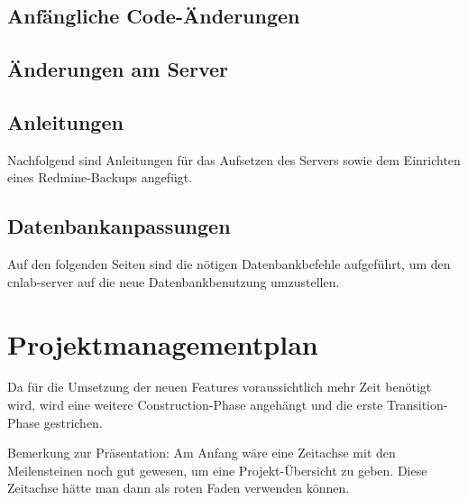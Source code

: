 \documentclass[12pt, a4paper]{report}
\begin{document}
	\section{Anfängliche Code-Änderungen}
	\label{sec:AnfaenglicheCodeAenderungen}
	
	
	\section{Änderungen am Server}
	\label{sec:AenderungenAmServer}
	
	
	\section{Anleitungen}
	\label{sec:Anleitungen}
	Nachfolgend sind Anleitungen für das Aufsetzen des Servers sowie dem Einrichten eines Redmine-Backups angefügt.
	
	
	
	
	\section{Datenbankanpassungen}
	\label{sec:Datenbankanpassungen}
	Auf den folgenden Seiten sind die nötigen Datenbankbefehle aufgeführt, um den cnlab-server auf die neue Datenbankbenutzung umzustellen.
	
	
	\chapter{Projektmanagementplan}
	
	Da für die Umsetzung der neuen Features voraussichtlich mehr Zeit benötigt wird, wird eine weitere Construction-Phase angehängt und die erste Transition-Phase gestrichen.
	
	Bemerkung zur Präsentation:
	Am Anfang wäre eine Zeitachse mit den Meilensteinen noch gut gewesen, um eine Projekt-Übersicht zu geben. Diese Zeitachse hätte man dann als roten Faden verwenden können.
	
\end{document}
